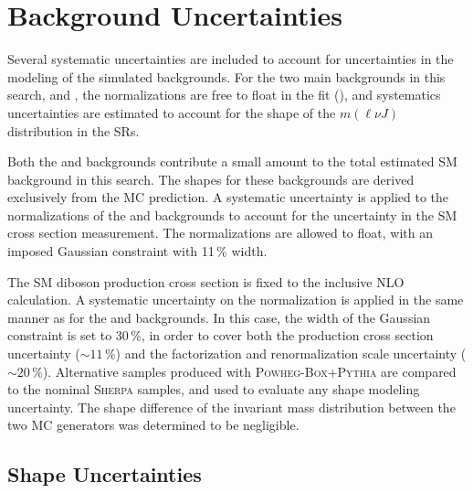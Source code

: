 \section{Background Uncertainties}
\label{ch:syst:bkg_unc}
Several systematic uncertainties are included to account for uncertainties in the modeling of the simulated backgrounds. For the two main backgrounds in this search, \Wjets and \ttbar, the normalizations are free to float in the fit (\Ch{\ref{ch:stats}}), and systematics uncertainties are estimated to account for the shape of the $m(\ell\nu J)$ distribution in the SRs.

Both the \Singlet and \Zjets backgrounds contribute a small amount to the total estimated SM background in this search. The shapes for these backgrounds are derived exclusively from the MC prediction. A systematic uncertainty is applied to the normalizations of the \Singlet and \Zjets backgrounds to account for the uncertainty in the SM cross section measurement. The normalizations are allowed to float, with an imposed Gaussian constraint with 11\,\% width.

The SM diboson production cross section is fixed to the inclusive NLO calculation. A systematic uncertainty on the normalization is applied in the same manner as for the \Singlet and \Zjets backgrounds. In this case, the width of the Gaussian constraint is set to 30\,\%, in order to cover both the production cross section uncertainty ($\sim11\,\%$) and the factorization and renormalization scale uncertainty ($\sim20\,\%$). Alternative samples produced with \textsc{Powheg-Box+Pythia} are compared to the nominal \textsc{Sherpa} samples, and used to evaluate any shape modeling uncertainty. The shape difference of the invariant mass distribution between the two MC generators was determined to be negligible. 

%
\subsection{\Wjets Shape Uncertainties}

